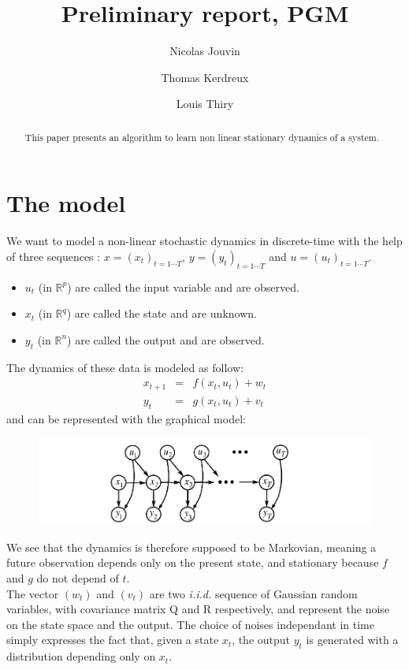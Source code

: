 \documentclass[11pt, oneside]{amsart}
\title[]{Preliminary report, PGM}
\author[1]{Nicolas Jouvin}
\author[2]{Thomas Kerdreux}
\author[3]{Louis Thiry}
\begin{document}
\maketitle
\begin{abstract}
This paper presents an algorithm to learn non linear stationary dynamics of a system.
\end{abstract}

\section{The model}


We want to model a non-linear stochastic dynamics in discrete-time with the help of three sequences : $x=(x_t)_{t=1\cdots T}$, $y=(y_t)_{t=1\cdots T}$ and  $u=(u_t)_{t=1 \cdots T}$.
\begin{itemize}
  \item $u_t$ (in $\mathbb{R}^p$) are called the input variable and are observed.
  \item $x_t$ (in $\mathbb{R}^q$) are called the state and are unknown.
  \item $y_t$ (in $\mathbb{R}^n$) are called the output and are observed.
\end{itemize}


The dynamics of these data is modeled as follow:
\begin{eqnarray}
x_{t+1}&=& f(x_t,u_t)+w_t\\
y_t &=& g(x_t,u_t)+v_t
\end{eqnarray}
and can be represented with the graphical model:
\begin{figure}[H]
	\includegraphics[width=14cm]{screenshot_graphical_model.PNG}
\end{figure}

We see that the dynamics is therefore supposed to be Markovian, meaning a future observation depends only on the present state, and stationary because $f$ and $g$ do not depend of $t$.\\
The vector $(w_t)$ and $(v_t)$ are two \textit{i.i.d.} sequence of Gaussian random variables, with covariance matrix Q and R respectively, and represent the noise on the state space and the output. The choice of noises independant in time simply expresses the fact that, given a state $x_t$, the output $y_t$ is generated with a distribution depending only on $x_t$. 
\end{document}
